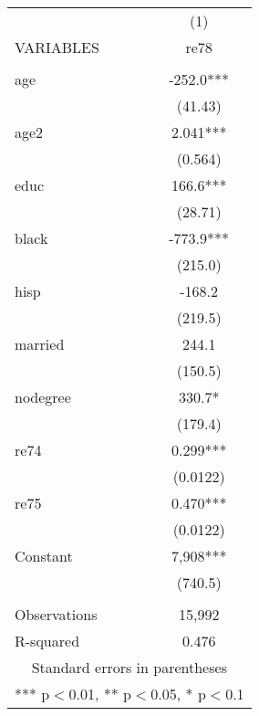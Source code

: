 \begin{tabular}{lc} \hline
 & (1) \\
VARIABLES & re78 \\ \hline
 &  \\
age & -252.0*** \\
 & (41.43) \\
age2 & 2.041*** \\
 & (0.564) \\
educ & 166.6*** \\
 & (28.71) \\
black & -773.9*** \\
 & (215.0) \\
hisp & -168.2 \\
 & (219.5) \\
married & 244.1 \\
 & (150.5) \\
nodegree & 330.7* \\
 & (179.4) \\
re74 & 0.299*** \\
 & (0.0122) \\
re75 & 0.470*** \\
 & (0.0122) \\
Constant & 7,908*** \\
 & (740.5) \\
 &  \\
Observations & 15,992 \\
 R-squared & 0.476 \\ \hline
\multicolumn{2}{c}{ Standard errors in parentheses} \\
\multicolumn{2}{c}{ *** p$<$0.01, ** p$<$0.05, * p$<$0.1} \\
\end{tabular}
